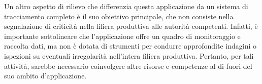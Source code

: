 Un altro aspetto di rilievo che differenzia questa applicazione da un sistema di tracciamento completo è il suo obiettivo principale, che non consiste nella segnalazione di criticità nella filiera produttiva alle autorità competenti. Infatti, è importante sottolineare che l'applicazione offre un quadro di monitoraggio e raccolta dati, ma non è dotata di strumenti per condurre approfondite indagini o ispezioni su eventuali irregolarità nell'intera filiera produttiva. Pertanto, per tali attività, sarebbe necessario coinvolgere altre risorse e competenze al di fuori del suo ambito d'applicazione.